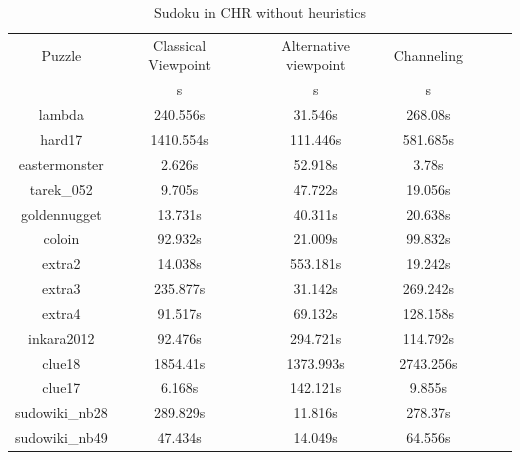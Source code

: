 \documentclass{report}
\begin{document}
\begin{table}[h!]
      \begin{tabular}{|c|c|c|c|c|c|c|}
        \hline
        \multirow{1}{*}{Puzzle} &
          \multicolumn{1}{L|}{Classical Viewpoint} &
          \multicolumn{1}{L|}{Alternative viewpoint} &
          \multicolumn{1}{L|}{Channeling} \\
        & s & s & s \\
        \hline
lambda & 240.556s & 31.546s & 268.08s \\
hard17 & 1410.554s & 111.446s & 581.685s \\
eastermonster & 2.626s & 52.918s & 3.78s \\
tarek\_052 & 9.705s & 47.722s & 19.056s \\
goldennugget & 13.731s & 40.311s & 20.638s \\
coloin & 92.932s & 21.009s & 99.832s \\
extra2 & 14.038s & 553.181s & 19.242s \\
extra3 & 235.877s & 31.142s & 269.242s \\
extra4 & 91.517s & 69.132s & 128.158s \\
inkara2012 & 92.476s & 294.721s & 114.792s \\
clue18 & 1854.41s & 1373.993s & 2743.256s \\
clue17 & 6.168s & 142.121s & 9.855s \\
sudowiki\_nb28 & 289.829s & 11.816s & 278.37s \\
sudowiki\_nb49 & 47.434s & 14.049s & 64.556s \\
 \hline
      \end{tabular}
        \caption{Sudoku in CHR without heuristics}

    \end{table}
    
\end{document}

